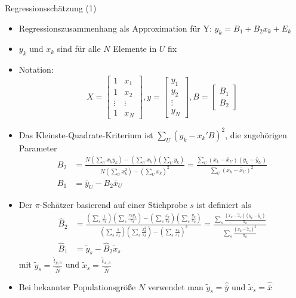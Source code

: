 \documentclass[9pt]{beamer}
\begin{document}
\begin{frame}{Regressionsschätzung  (1)}\small
\begin{itemize}
	\item Regressionszusammenhang als Approximation für Y: $y_k = B_1 + B_2 x_k + E_k$ 
	\item $y_k$ und $x_k$ sind für alle $N$ Elemente in $U$ fix
	\item Notation: $$X = \begin{bmatrix}1 & x_1\\1 & x_2\\\vdots & \vdots \\ 1 & x_N\end{bmatrix}, y = \begin{bmatrix} y_1\\ y_2\\ \vdots \\ y_N \end{bmatrix}, B=\begin{bmatrix}B_1\\B_2\end{bmatrix}$$
	\item Das Kleinste-Quadrate-Kriterium ist $\sum_U(y_k-x_k'B)^2$, die zugehörigen Parameter
	\begin{align*}
	B_2 &= \frac{N\left(\sum_U x_k y_k\right)-\left(\sum_U x_k\right)\left(\sum_U y_k\right)}{N\left(\sum_U x_k^2\right)-\left(\sum_U x_k\right)^2}=\frac{\sum_U\left(x_k - \bar{x}_U\right)\left(y_k - \bar{y}_U\right)}{\sum_U \left(x_k - \bar{x}_U\right)^2}\\
	B_1 &= \bar{y}_U - B_2 \bar{x}_U
	\end{align*}
	\item Der $\pi$-Schätzer basierend auf einer Stichprobe $s$ ist definiert als
	\begin{align*}
	\hat{B}_2 &=\frac{\left(\sum_s \frac{1}{\pi_k}\right)\left(\sum_s \frac{x_k y_k}{\pi_k}\right)-\left(\sum_s \frac{x_k}{\pi_k}\right)\left(\sum_s \frac{y_k}{\pi_k}\right)}{\left(\sum_s \frac{1}{\pi_k}\right)\left(\sum_s \frac{x_k^2}{\pi_k}\right)-\left(\sum_s \frac{x_k}{\pi_k}\right)^2} = \frac{\sum_s\frac{\left(x_k - \tilde{x}_s\right)\left(y_k - \tilde{y}_s\right)}{\pi_k}}{\sum_s \frac{\left(x_k-\tilde{x}_s\right)^2}{\pi_k}}\\
	\hat{B}_1 &= \tilde{y}_s - \hat{B}_2 \tilde{x}_s
	\end{align*}
	mit $\tilde{y}_s = \frac{\hat{t}_{y,\pi}}{\hat{N}}$ und $\tilde{x}_s = \frac{\hat{t}_{x,\pi}}{\hat{N}}$
	\item Bei bekannter Populationsgröße $N$ verwendet man $\tilde{y}_s=\hat{\bar{y}}$ und $\tilde{x}_s=\hat{\bar{x}}$
\end{itemize}
\end{frame}
\end{document}
